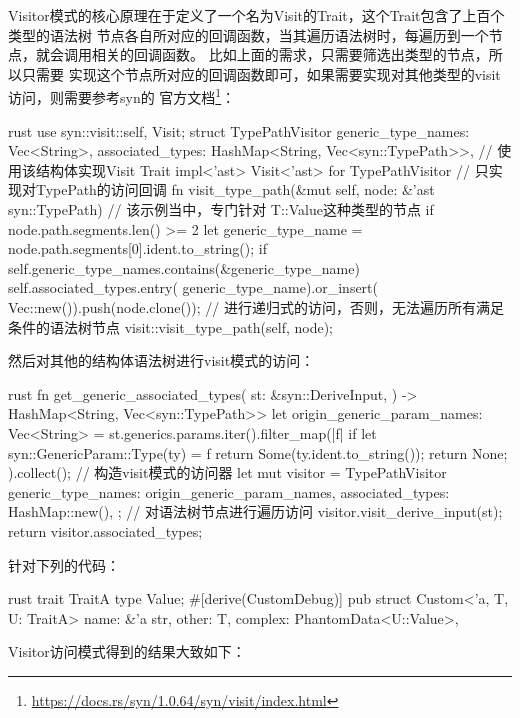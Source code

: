 Visitor模式的核心原理在于定义了一个名为Visit的Trait，这个Trait包含了上百个类型的语法树
节点各自所对应的回调函数，当其遍历语法树时，每遍历到一个节点，就会调用相关的回调函数。
比如上面的需求，只需要筛选出类型的节点，所以只需要
实现这个节点所对应的回调函数即可，如果需要实现对其他类型的visit访问，则需要参考syn的
官方文档\footnote{\url{https://docs.rs/syn/1.0.64/syn/visit/index.html}}：
\begin{code-block}{rust}
use syn::visit::{self, Visit};
struct TypePathVisitor {
    generic_type_names: Vec<String>,
    associated_types: HashMap<String, Vec<syn::TypePath>>,
}
// 使用该结构体实现Visit Trait
impl<'ast> Visit<'ast> for TypePathVisitor {
    // 只实现对TypePath的访问回调
    fn visit_type_path(&mut self, node: &'ast syn::TypePath) {
        // 该示例当中，专门针对 T::Value这种类型的节点
        if node.path.segments.len() >= 2 {
            let generic_type_name = node.path.segments[0].ident.to_string();
            if self.generic_type_names.contains(&generic_type_name) {
                self.associated_types.entry(
                    generic_type_name).or_insert(
                        Vec::new()).push(node.clone());
            }
        }
        // 进行递归式的访问，否则，无法遍历所有满足条件的语法树节点
        visit::visit_type_path(self, node);
    }
}
\end{code-block}
然后对其他的结构体语法树进行visit模式的访问：
\begin{code-block}{rust}
fn get_generic_associated_types(
    st: &syn::DeriveInput,
) -> HashMap<String, Vec<syn::TypePath>> {
    let origin_generic_param_names: Vec<String> =
        st.generics.params.iter().filter_map(|f| {
            if let syn::GenericParam::Type(ty) = f {
                return Some(ty.ident.to_string());
            }
            return None;
        }).collect();
    // 构造visit模式的访问器
    let mut visitor = TypePathVisitor {
        generic_type_names: origin_generic_param_names,
        associated_types: HashMap::new(),
    };
    // 对语法树节点进行遍历访问
    visitor.visit_derive_input(st);
    return visitor.associated_types;
}
\end{code-block}
针对下列的代码：
\begin{code-block}{rust}
trait TraitA { type Value; }
#[derive(CustomDebug)]
pub struct Custom<'a, T, U: TraitA> {
    name: &'a str,
    other: T,
    complex: PhantomData<U::Value>,
}
\end{code-block}
Visitor访问模式得到的结果大致如下：
